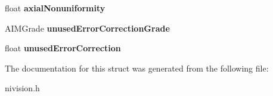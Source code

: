 \begin{DoxyCompactItemize}
\item 
\hypertarget{structAIMGradeReport__struct_a9051221bdeeabde7a2e18153cae3fdb4}{float {\bfseries axial\-Nonuniformity}}\label{structAIMGradeReport__struct_a9051221bdeeabde7a2e18153cae3fdb4}

\item 
\hypertarget{structAIMGradeReport__struct_a090d2ed2bd6bb767a6e9e1e4a5c83961}{\-A\-I\-M\-Grade {\bfseries unused\-Error\-Correction\-Grade}}\label{structAIMGradeReport__struct_a090d2ed2bd6bb767a6e9e1e4a5c83961}

\item 
\hypertarget{structAIMGradeReport__struct_a1b9cc87d5be396f730463b063bf37cee}{float {\bfseries unused\-Error\-Correction}}\label{structAIMGradeReport__struct_a1b9cc87d5be396f730463b063bf37cee}

\end{DoxyCompactItemize}


\-The documentation for this struct was generated from the following file\-:\begin{DoxyCompactItemize}
\item 
nivision.\-h\end{DoxyCompactItemize}

